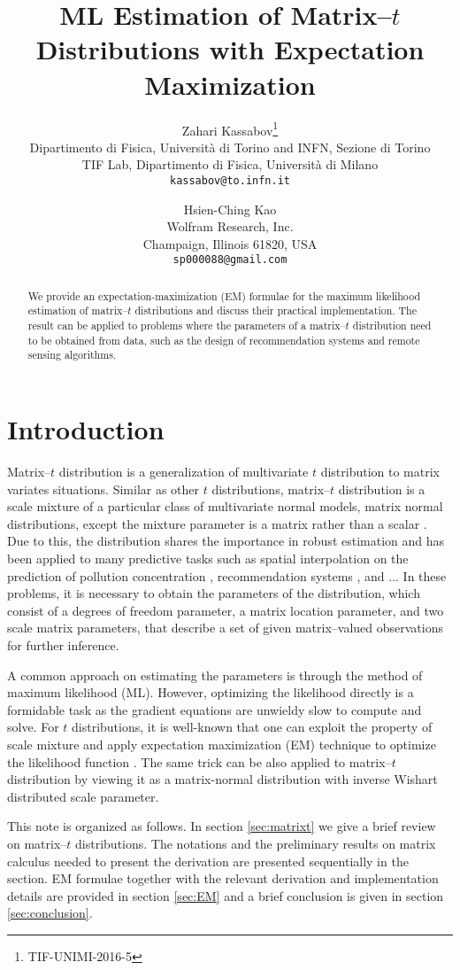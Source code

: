 \documentclass[english,listof=totoc]{scrartcl}
\title{ML Estimation of Matrix--$t$ Distributions with Expectation Maximization}
\author{Zahari Kassabov\thanks{TIF-UNIMI-2016-5}\\
        Dipartimento di Fisica, Universit\`a di Torino and INFN, Sezione di Torino\\
		TIF Lab, Dipartimento di Fisica, Universit\`a di Milano\\
        \texttt{kassabov@to.infn.it}\\
        \and
        Hsien-Ching Kao\\
        Wolfram Research, Inc.\\
		Champaign, Illinois 61820, USA\\
		\texttt{sp000088@gmail.com}
		}
\begin{document}
\maketitle

\begin{abstract}
We provide an expectation-maximization (EM) formulae for the maximum likelihood estimation of matrix--$t$ distributions and discuss their practical implementation. The result can be applied to problems where the parameters of a matrix--$t$ distribution need to be obtained from data, such as the design of recommendation systems and remote sensing algorithms.
\end{abstract}

\section{Introduction}
Matrix--$t$ distribution is a generalization of multivariate $t$ distribution to matrix variates situations. Similar as other $t$ distributions, matrix--$t$ distribution is a scale mixture of a particular class of multivariate normal models, matrix normal distributions, except the mixture parameter is a matrix rather than a scalar \citep{gupta1999matrix}. Due to this, the distribution shares the importance in robust estimation and has been applied to many predictive tasks such as spatial interpolation on the prediction of pollution concentration \citep{KIBRIA2006785}, recommendation systems \citep{NIPS2007_3203}, and ... In these problems, it is necessary to obtain the parameters of the distribution, which consist of a degrees of freedom parameter, a matrix location parameter, and two scale matrix parameters, that describe a set of given matrix--valued observations for further inference.

A common approach on estimating the parameters is through the method of maximum likelihood (ML). However, optimizing the likelihood directly is a formidable task as the gradient equations are unwieldy slow to compute and solve. For $t$ distributions, it is well-known that one can exploit the property of scale mixture and apply expectation maximization (EM) technique to optimize the likelihood function \citep{10.2307/24305551}. The same trick can be also applied to matrix--$t$ distribution by viewing it as a matrix-normal distribution with inverse Wishart distributed scale parameter.

This note is organized as follows. In section \ref{sec:matrixt} we give a brief review on matrix--$t$ distributions. The notations and the preliminary results on matrix calculus needed to present the derivation are presented sequentially in the section. EM formulae together with the relevant derivation and implementation details are provided in section \ref{sec:EM} and a brief conclusion is given in section \ref{sec:conclusion}.
\end{document}
